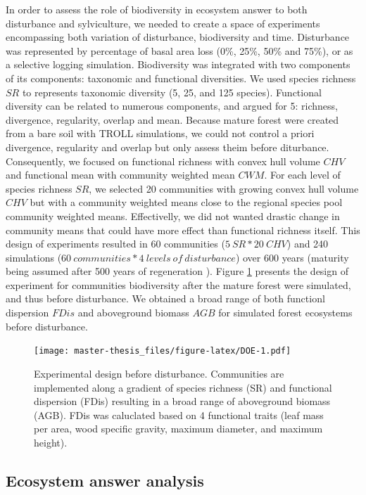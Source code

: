 \documentclass[12pt,]{article}
\theoremstyle{definition}
\theoremstyle{definition}
\theoremstyle{remark}
\begin{document}
In order to assess the role of biodiversity in ecosystem answer to both
disturbance and sylviculture, we needed to create a space of experiments
encompassing both variation of disturbance, biodiversity and time.
Disturbance was represented by percentage of basal area loss (0\%, 25\%,
50\% and 75\%), or as a selective logging simulation. Biodiversity was
integrated with two components of its components: taxonomic and
functional diversities. We used species richness \(SR\) to represents
taxonomic diversity (5, 25, and 125 species). Functional diversity can
be related to numerous components, and \citet{Borgy2017} argued for 5:
richness, divergence, regularity, overlap and mean. Because mature
forest were created from a bare soil with TROLL simulations, we could
not control a priori divergence, regularity and overlap but only assess
theim before diturbance. Consequently, we focused on functional richness
with convex hull volume \(CHV\) and functional mean with community
weighted mean \(CWM\). For each level of species richness \(SR\), we
selected 20 communities with growing convex hull volume \(CHV\) but with
a community weighted means close to the regional species pool community
weighted means. Effectivelly, we did not wanted drastic change in
community means that could have more effect than functional richness
itself. This design of experiments resulted in 60 communities
(\(5~SR*20~CHV\)) and 240 simulations
(\(60 ~communities*4~levels~of~disturbance\)) over 600 years (maturity
being assumed after 500 years of regeneration \citep{Li}). Figure
\ref{fig:DOE} presents the design of experiment for communities
biodiversity after the mature forest were simulated, and thus before
disturbance. We obtained a broad range of both functionl dispersion
\(FDis\) and aboveground biomass \(AGB\) for simulated forest ecosystems
before disturbance.

\begin{figure}[htbp]
\centering
\texttt{[image: master-thesis\_files/figure-latex/DOE-1.pdf]}
\caption{\label{fig:DOE}Experimental design before disturbance. Communities
are implemented along a gradient of species richness (SR) and functional
dispersion (FDis) resulting in a broad range of aboveground biomass
(AGB). FDis was caluclated based on 4 functional traits (leaf mass per
area, wood specific gravity, maximum diameter, and maximum height).}
\end{figure}

\subsection{Ecosystem answer analysis}\label{ecosystem-answer-analysis}
\end{document}
